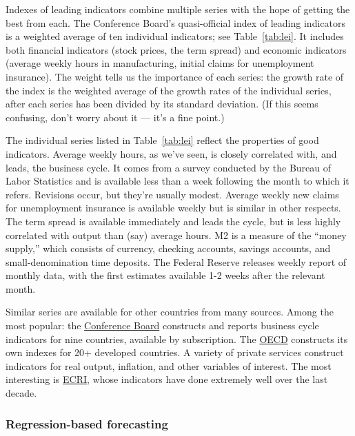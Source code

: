\documentclass[letterpaper,12pt]{article}
\begin{document}
Indexes of leading indicators combine multiple series with the
hope of getting the best from each.  The Conference Board's
quasi-official index of leading indicators is a weighted average
of ten individual indicators;  see Table~\ref{tab:lei}. It
includes both financial indicators (stock prices, the term spread)
and economic indicators (average weekly hours in manufacturing,
initial claims for unemployment insurance).  The weight tells us
the importance of each series: the growth rate of the index is the
weighted average of the growth rates of the individual series,
after each series has been divided by its standard deviation.  (If
this seems confusing, don't worry about it --- it's a fine point.)


The individual series listed in Table~\ref{tab:lei} reflect the
properties of good indicators.  Average weekly hours, as we've
seen, is closely correlated with, and leads, the business cycle.
It comes from a survey conducted by the Bureau of Labor Statistics
and is available less than a week following the month to which it
refers.  Revisions occur, but they're usually modest. Average
weekly new claims for unemployment insurance is available weekly
but is similar in other respects.  The term spread is available
immediately and leads the cycle, but is less highly correlated
with output than (say) average hours.  M2 is a measure of the
``money supply,'' which consists of currency, checking accounts,
savings accounts, and small-denomination time deposits. The
Federal Reserve releases weekly report of monthly data, with the
first estimates available 1-2 weeks after the relevant month.


Similar series are available for other countries from many
sources. Among the most popular:  the %
\href{http://www.conference-board.org/economics/bci/}{Conference
Board} constructs and reports business cycle indicators for nine
countries, available by subscription.  The %
\href{http://www.oecd.org/department/0,2688,en_2649_34349_1_1_1_1_1,00.html}{OECD}
constructs its own indexes for 20+ developed countries. A variety
of private services construct indicators for real output,
inflation, and other variables of interest.  The most interesting
is %
\href{http://www.businesscycle.com/}{ECRI}, whose indicators have
done extremely well over the last decade.


\subsubsection*{Regression-based forecasting}
\end{document}
